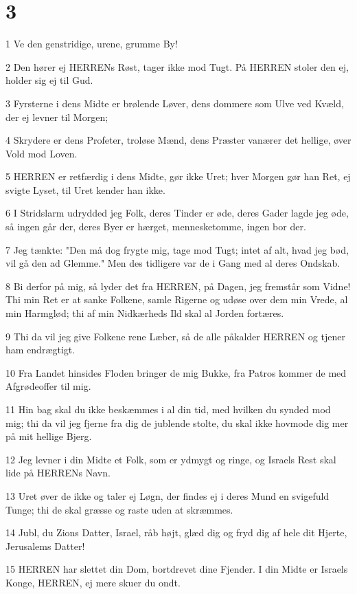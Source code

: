 \chapter{3}

\par 1 Ve den genstridige, urene, grumme By!
\par 2 Den hører ej HERRENs Røst, tager ikke mod Tugt. På HERREN stoler den ej, holder sig ej til Gud.
\par 3 Fyrsterne i dens Midte er brølende Løver, dens dommere som Ulve ved Kvæld, der ej levner til Morgen;
\par 4 Skrydere er dens Profeter, troløse Mænd, dens Præster vanærer det hellige, øver Vold mod Loven.
\par 5 HERREN er retfærdig i dens Midte, gør ikke Uret; hver Morgen gør han Ret, ej svigte Lyset, til Uret kender han ikke.
\par 6 I Stridslarm udrydded jeg Folk, deres Tinder er øde, deres Gader lagde jeg øde, så ingen går der, deres Byer er hærget, mennesketomme, ingen bor der.
\par 7 Jeg tænkte: "Den må dog frygte mig, tage mod Tugt; intet af alt, hvad jeg bød, vil gå den ad Glemme." Men des tidligere var de i Gang med al deres Ondskab.
\par 8 Bi derfor på mig, så lyder det fra HERREN, på Dagen, jeg fremstår som Vidne! Thi min Ret er at sanke Folkene, samle Rigerne og udøse over dem min Vrede, al min Harmglød; thi af min Nidkærheds Ild skal al Jorden fortæres.
\par 9 Thi da vil jeg give Folkene rene Læber, så de alle påkalder HERREN og tjener ham endrægtigt.
\par 10 Fra Landet hinsides Floden bringer de mig Bukke, fra Patros kommer de med Afgrødeoffer til mig.
\par 11 Hin bag skal du ikke beskæmmes i al din tid, med hvilken du synded mod mig; thi da vil jeg fjerne fra dig de jublende stolte, du skal ikke hovmode dig mer på mit hellige Bjerg.
\par 12 Jeg levner i din Midte et Folk, som er ydmygt og ringe, og Israels Rest skal lide på HERRENs Navn.
\par 13 Uret øver de ikke og taler ej Løgn, der findes ej i deres Mund en svigefuld Tunge; thi de skal græsse og raste uden at skræmmes.
\par 14 Jubl, du Zions Datter, Israel, råb højt, glæd dig og fryd dig af hele dit Hjerte, Jerusalems Datter!
\par 15 HERREN har slettet din Dom, bortdrevet dine Fjender. I din Midte er Israels Konge, HERREN, ej mere skuer du ondt.
